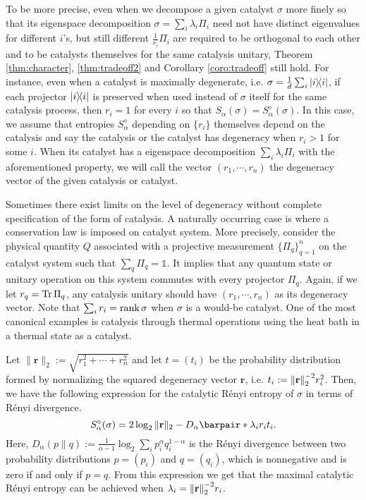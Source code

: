 \documentclass[aps, reprint, amsmath,amssymb, prx, superscriptaddress]{revtex4-2}
\begin{document}
To be more precise, even when we decompose a given catalyst $\sigma$ more finely so that its eigenspace decomposition $\sigma=\sum_i \lambda_i \Pi_i$ need not have distinct eigenvalues for different $i$'s, but still different $\frac{1}{r_i}\Pi_i$ are required to be orthogonal to each other and to be catalysts themselves for the same catalysis unitary, Theorem \ref{thm:character}, \ref{thm:tradeoff2} and Corollary \ref{coro:tradeoff} still hold. For instance, even when a catalyst is maximally degenerate, i.e. $\sigma=\frac{1}{d}\sum_i \dyad{i}$, if each projector $\dyad{i}$ is preserved when used instead of $\sigma$ itself for the same catalysis process, then $r_i=1$ for every $i$ so that $S_\alpha(\sigma)=S_\alpha^\diamond(\sigma)$. In this case, we assume that entropies $S_\alpha^\diamond$ depending on $\{r_i\}$ themselves depend on the catalysis and say the catalysis or the catalyst has degeneracy when $r_i>1$ for some $i$. When its catalyst has a eigenspace decomposition $\sum_i \lambda_i \Pi_i$ with the aforementioned property, we will call the vector $(r_1,\cdots,r_n)$ the degeneracy vector of the given catalysis or catalyst.


 Sometimes there exist limits on the level of degeneracy without complete specification of the form of catalysis. A naturally occurring case is where a conservation law is imposed on catalyst system. More precisely, consider the physical quantity $Q$ associated with a projective measurement $\{\Pi_{q}\}_{q=1}^n$ on the catalyst system such that $\sum_q \Pi_q = \mathds{1}$. It implies that any quantum state or unitary operation on this system commutes with every projector $\Pi_q$. Again, if we let $r_q=\Tr \Pi_q$, any catalysis unitary should have $(r_1,\cdots,r_n)$ as its degeneracy vector. Note that $\sum_i r_i = \rank \sigma$ when $\sigma$ is a would-be catalyst. One of the most canonical examples is catalysis through thermal operations using the heat bath in a thermal state as a catalyst.

 
 
 Let $\|\textbf{r}\|_2:=\sqrt{r_1^2 + \cdots + r_n^2}$ and let $t=(t_i)$ be the probability distribution formed by normalizing the squared degeneracy vector $\textbf{r}$, i.e. $t_i:=\norm{\textbf{r}}_2^{-2}r_i^2$. Then, we have the following expression for the catalytic R\'{e}nyi entropy of $\sigma$ in terms of R\'{e}nyi divergence.
 \begin{equation}
     S_\alpha^\diamond(\sigma)= 2\log_2  \|\textbf{r}\|_2 - D_\alpha \barpair*{\lambda_i r_i}{t_i}.
 \end{equation}
Here, $D_\alpha(p\|q):=\frac{1}{\alpha-1}\log_2 \sum_ip_i^\alpha q_i^{1-\alpha}$ is the R\'{e}nyi divergence between two probability distributions $p=(p_i)$ and $q=(q_i)$, which is nonnegative and is zero if and only if $p=q$. From this expression we get that the maximal catalytic R\'{e}nyi entropy can be achieved when $\lambda_i=\norm{\textbf{r}}_2^{-2}r_i$.
 
\end{document}

